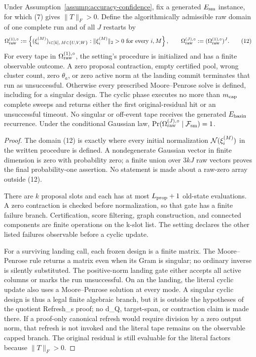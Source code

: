 \begin{proposition}\label{prop:step-012-finite-tapes}
Under Assumption~\ref{assump:accuracy-confidence}, fix a generated
\(E_{\rm sm}\) instance, for which (7) gives \(\|T\|_F>0\). Define the
algorithmically admissible raw domain of one complete run and of all \(J\)
restarts by
\[
 \Omega_{\rm raw}^{(1),\circ}:=
 \left\{(\xi_i^{(M)})_{i\in[k],\,M\in\{U,V,W\}}:
   \|\xi_i^{(M)}\|_2>0\ \text{for every }i,M\right\},
 \qquad
 \Omega_{\rm raw}^{(J),\circ}:=
   (\Omega_{\rm raw}^{(1),\circ})^J.
\tag{12}
\]
For every tape in \(\Omega_{\rm raw}^{(1),\circ}\), the setting's procedure
is initialized and has a finite observable outcome. A zero proposal
contraction, empty certified pool, wrong cluster count, zero \(\theta_a\), or
zero active norm at the landing commit terminates that run as unsuccessful.
Otherwise every prescribed Moore--Penrose solve is defined, including for a
singular design. The cyclic phase executes no more than \(m_{\rm cap}\)
complete sweeps and returns either the first original-residual hit or an
unsuccessful timeout. No singular or off-event tape receives the generated
\(E_{\rm basin}\) recurrence. Under the conditional Gaussian law,
\(\Pr(\Omega_{\rm raw}^{(J),\circ}\mid{\cal F}_{\rm sm})=1\).

\begin{proof}
The domain (12) is exactly where every initial normalization
\({\cal N}(\xi_i^{(M)})\) in the written procedure is defined. A nondegenerate
Gaussian vector in finite dimension is zero with probability zero; a finite
union over \(3kJ\) raw vectors proves the final probability-one assertion.
No statement is made about a raw-zero array outside (12).

There are \(k\) proposal slots and each has at most
\(L_{\rm prop}+1\) old-state evaluations. A zero contraction is checked before
normalization, so that gate has a finite failure branch. Certification,
score filtering, graph construction, and connected components are finite
operations on the k-slot list. The setting declares the other listed
failures observable before a cyclic update.

For a surviving landing call, each frozen design is a finite matrix. The
Moore--Penrose rule returns a matrix even when its Gram is singular; no
ordinary inverse is silently substituted. The positive-norm landing gate
either accepts all active columns or marks the run unsuccessful. On an
the landing, the literal cyclic update also uses a Moore--Penrose
solution at every mode. A singular cyclic design is thus a legal finite
algebraic branch, but it is outside the hypotheses of the quotient
Refresh\_s proof; no d\_Q, target-span, or contraction claim is made there.
If a proof-only canonical refresh would require division by a zero output
norm, that refresh is not invoked and the literal tape remains on the
observable capped branch. The original residual is still evaluable for the
literal factors because \(\|T\|_F>0\).


\end{proof}
\end{proposition}

